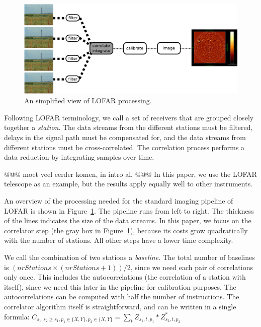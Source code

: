 \documentclass{article}
\begin{document}
\begin{figure}[t]
\begin{center}
\includegraphics[width=12cm]{figures/processing-overview.pdf}
\end{center}
\vspace{-0.5cm}
\caption{An simplified view of LOFAR processing.}
\label{fig-processing-overview}
\end{figure}

Following LOFAR terminology, we call a set of receivers that are grouped closely
together a \emph{station}. The data streams from the different
stations must be filtered, delays in the signal path must be
compensated for, and the data streams from different stations must be
cross-correlated. The correlation process performs a data reduction by
integrating samples over time. 


@@@ moet veel eerder komen, in intro al. @@@
In this paper, we use the LOFAR
telescope as an example, but the results apply equally well
to other instruments. 

An overview of the processing needed for the
standard imaging pipeline of LOFAR is shown in
Figure~\ref{fig-processing-overview}. The pipeline runs from left to right.
The thickness of the lines indicates the size of the data streams.
In this paper, we focus on the
correlator step (the gray box in
Figure~\ref{fig-processing-overview}), because its costs grow
quadratically with the number of stations. All other steps have a
lower time complexity. 


We call the combination of two stations a
\emph{baseline}.  The total number of baselines is $(nrStations \times
(nrStations + 1)) / 2$, since we need each pair of correlations only
once. This includes the autocorrelations (the correlation of a station with itself),
since we need this later in the pipeline for calibration purposes.
The autocorrelations can be computed with half the number of instructions.
The correlator algorithm itself is straightforward, and can be
written in a single formula:
$C_{s_1,s_2\geq s_1,p_1\in\{X,Y\},p_2\in\{X,Y\}} = \displaystyle\sum_{t} Z_{s_1,t,p_1} * Z_{s_2,t,p_2}^\ast$ 
\end{document}
